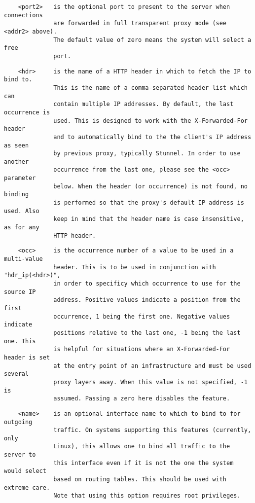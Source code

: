 \begin{verbatim}
    <port2>   is the optional port to present to the server when connections
              are forwarded in full transparent proxy mode (see <addr2> above).
              The default value of zero means the system will select a free
              port.
\end{verbatim}

\begin{verbatim}
    <hdr>     is the name of a HTTP header in which to fetch the IP to bind to.
              This is the name of a comma-separated header list which can
              contain multiple IP addresses. By default, the last occurrence is
              used. This is designed to work with the X-Forwarded-For header
              and to automatically bind to the the client's IP address as seen
              by previous proxy, typically Stunnel. In order to use another
              occurrence from the last one, please see the <occ> parameter
              below. When the header (or occurrence) is not found, no binding
              is performed so that the proxy's default IP address is used. Also
              keep in mind that the header name is case insensitive, as for any
              HTTP header.
\end{verbatim}

\begin{verbatim}
    <occ>     is the occurrence number of a value to be used in a multi-value
              header. This is to be used in conjunction with "hdr_ip(<hdr>)",
              in order to specificy which occurrence to use for the source IP
              address. Positive values indicate a position from the first
              occurrence, 1 being the first one. Negative values indicate
              positions relative to the last one, -1 being the last one. This
              is helpful for situations where an X-Forwarded-For header is set
              at the entry point of an infrastructure and must be used several
              proxy layers away. When this value is not specified, -1 is
              assumed. Passing a zero here disables the feature.
\end{verbatim}

\begin{verbatim}
    <name>    is an optional interface name to which to bind to for outgoing
              traffic. On systems supporting this features (currently, only
              Linux), this allows one to bind all traffic to the server to
              this interface even if it is not the one the system would select
              based on routing tables. This should be used with extreme care.
              Note that using this option requires root privileges.
\end{verbatim}

